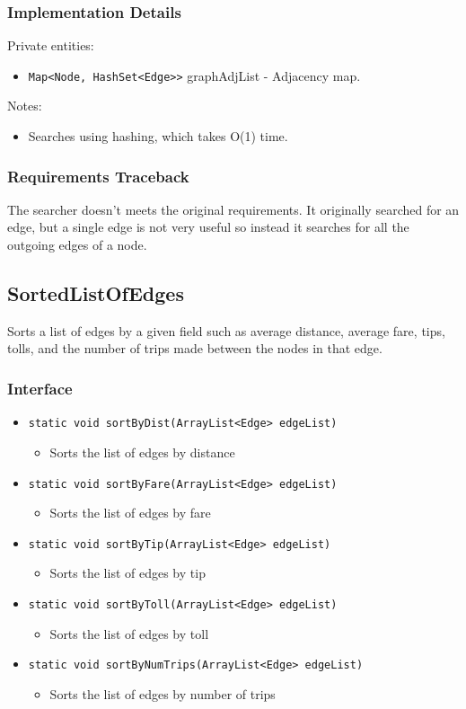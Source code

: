 \documentclass[12pt]{article}
\newcommand{\bi}{\begin{itemize}}
\newcommand{\ei}{\end{itemize}}
\newcommand{\code}[1]{\texttt{#1}}
\begin{document}
\subsubsection{Implementation Details}

Private entities:

\bi
	\item \code{Map<Node, HashSet<Edge>>} graphAdjList - Adjacency map.
\ei

\noindent Notes:

\bi
    \item Searches using hashing, which takes O(1) time. 
\ei

\subsubsection{Requirements Traceback}

The searcher doesn't meets the original requirements. It originally searched for an edge, but a single edge is not very useful so instead it searches for all the outgoing edges of a node.

\newpage

\subsection{SortedListOfEdges}

Sorts a list of edges by a given field such as average distance, average fare, tips, tolls, and the number of trips made between the nodes in that edge. 

\subsubsection{Interface}

\bi
	\item \code{static void sortByDist(ArrayList<Edge> edgeList)}
	\bi
		\item Sorts the list of edges by distance
	\ei
	\item \code{static void sortByFare(ArrayList<Edge> edgeList)}
	\bi
		\item Sorts the list of edges by fare
	\ei
	\item \code{static void sortByTip(ArrayList<Edge> edgeList)}
	\bi
		\item Sorts the list of edges by tip
	\ei
	\item \code{static void sortByToll(ArrayList<Edge> edgeList)}
	\bi
		\item Sorts the list of edges by toll
	\ei
	\item \code{static void sortByNumTrips(ArrayList<Edge> edgeList)}
	\bi
		\item Sorts the list of edges by number of trips
	\ei
\ei
\end{document}
